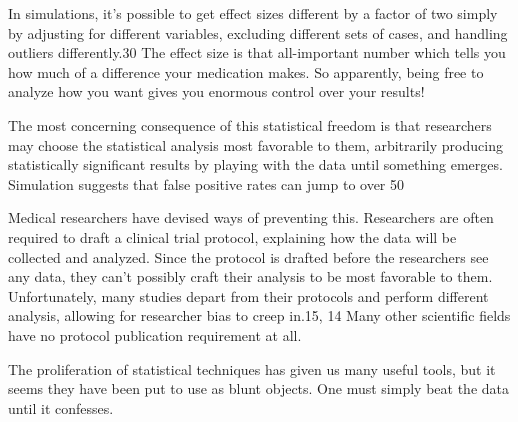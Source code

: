 In simulations, it’s possible to get effect sizes different by a factor of two simply by adjusting for different variables, excluding different sets of cases, and handling outliers differently.30 The effect size is that all-important number which tells you how much of a difference your medication makes. So apparently, being free to analyze how you want gives you enormous control over your results!

The most concerning consequence of this statistical freedom is that researchers may choose the statistical analysis most favorable to them, arbitrarily producing statistically significant results by playing with the data until something emerges. Simulation suggests that false positive rates can jump to over 50%

Medical researchers have devised ways of preventing this. Researchers are often required to draft a clinical trial protocol, explaining how the data will be collected and analyzed. Since the protocol is drafted before the researchers see any data, they can’t possibly craft their analysis to be most favorable to them. Unfortunately, many studies depart from their protocols and perform different analysis, allowing for researcher bias to creep in.15, 14 Many other scientific fields have no protocol publication requirement at all.

The proliferation of statistical techniques has given us many useful tools, but it seems they have been put to use as blunt objects. One must simply beat the data until it confesses.